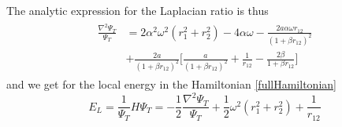\documentclass[english, a4paper]{article}
\begin{document}
The analytic expression for the Laplacian ratio is thus
\begin{align}
\begin{split}
 \frac{\nabla^2\Psi_T}{\Psi_T} &= 2\alpha^2 \omega^2(r_1^2 + r_2^2) - 4\alpha \omega
 - \frac{2a\alpha \omega r_{12}}{(1+\beta r_{12})^2} \\
 &+ \frac{2a}{(1+\beta r_{12})^2}\Biggr[ \frac{a}{(1+\beta r_{12})^2} + 
              \frac{1}{r_{12}} - \frac{2\beta}{1 + \beta r_{12}} \Biggr]
              \label{analyticLocalEnergy}
\end{split}
\end{align}
and we get for the local energy in the Hamiltonian \eqref{fullHamiltonian}
\begin{equation}
 E_L = \frac{1}{\Psi_T}H\Psi_T = -\frac{1}{2}\frac{\nabla^2\Psi_T}{\Psi_T} + 
 \frac{1}{2}\omega^2(r_1^2 + r_2^2) + \frac{1}{r_{12}}
\end{equation}
\end{document}
